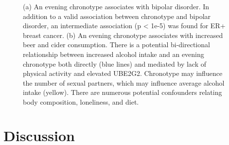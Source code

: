 \documentclass[journal,article,submit,moreauthors,pdftex]{Definitions/mdpi}
\begin{document}
\begin{figure}[htbp]
\begin{subfigure}{.5\linewidth}
\caption{}
\label{chronoBeer}
\end{subfigure}
\caption{(a) An evening chronotype associates with bipolar disorder. In addition to a valid association between chronotype and bipolar disorder, an intermediate association (p < 1e-5) was found for ER+ breast cancer. (b) An evening chronotype associates with increased beer and cider consumption. There is a potential bi-directional relationship between increased alcohol intake and an evening chronotype both directly (blue lines) and mediated by lack of physical activity and elevated UBE2G2. Chronotype may influence the number of sexual partners, which may influence average alcohol intake (yellow). There are numerous potential confounders relating body composition, loneliness, and diet.}
\label{chronoBeerBipolar}
\end{figure}




\section{Discussion}
\end{document}
